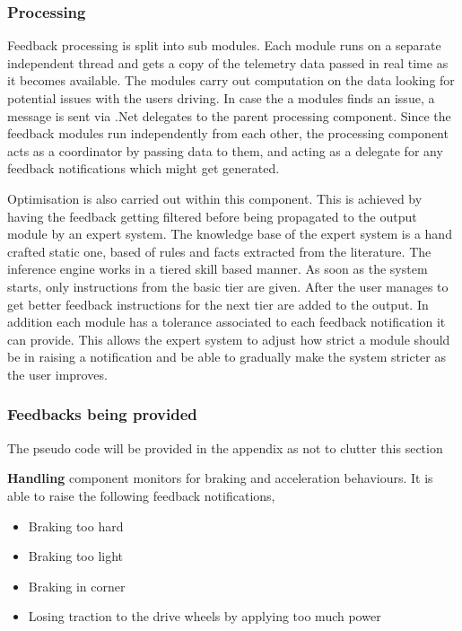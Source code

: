 \subsubsection{Processing}
	Feedback processing is split into sub modules. Each module runs on a separate independent thread and gets a copy of the telemetry data passed in real time as it becomes available. The modules carry out computation on the data looking for potential issues with the users driving. In case the a modules finds an issue, a message is sent via .Net delegates to the parent processing component. Since the feedback modules run independently from each other, the processing component acts as a coordinator by passing data to them, and acting as a delegate for any feedback notifications which might get generated. 
	
	Optimisation is also carried out within this component. This is achieved by having the feedback getting filtered before being propagated to the output module by an expert system. The knowledge base of the expert system is a hand crafted static one, based of rules and facts extracted from the literature. The inference engine works in a tiered skill based manner. As soon as the system starts, only instructions from the basic tier are given. After the user manages to get better feedback instructions for the next tier are added to the output. In addition each module has a tolerance associated to each feedback notification it can provide. This allows the expert system to adjust how strict a module should be in raising a notification and be able to gradually make the system stricter as the user improves.

\subsubsection{Feedbacks being provided}

The pseudo code will be provided in the appendix as not to clutter this section 

\textbf{Handling} component monitors for braking and acceleration behaviours. It is able to raise the following feedback notifications, 
\begin{itemize}
	\item Braking too hard
	\item Braking too light
	\item Braking in corner
	\item Losing traction to the drive wheels by applying too much power
\end{itemize}

